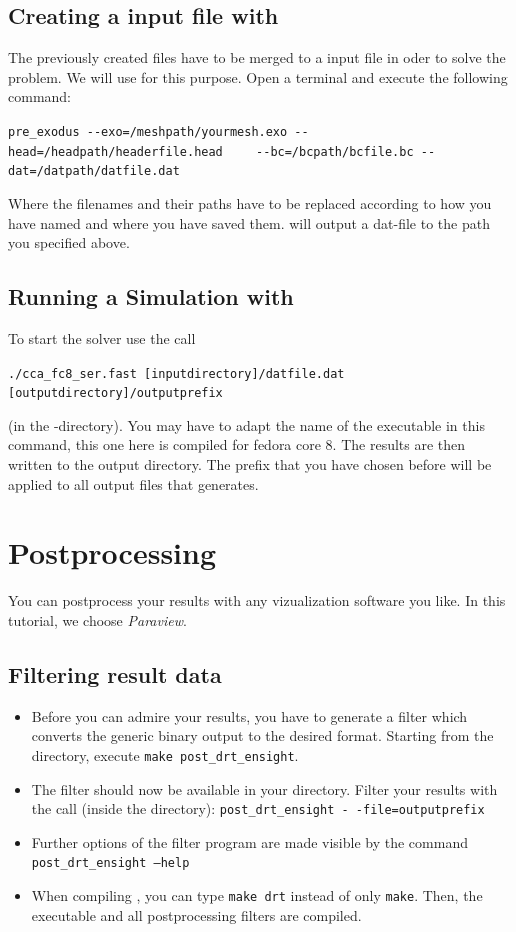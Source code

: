 \subsection{Creating a \baci{} input file with \prexo}
The previously created files have to be merged to a \baci{} input file in oder 
to solve the problem. We will use \prexo for this purpose. Open a terminal 
and execute the following command:
\begin{center}
  \verb|pre_exodus --exo=/meshpath/yourmesh.exo --head=/headpath/headerfile.head|
  \verb|	--bc=/bcpath/bcfile.bc --dat=/datpath/datfile.dat|
\end{center}
Where the filenames and their paths have to be replaced according to how you have named and where you have saved them.
\prexo will output a dat-file to the path you specified above.


\subsection{Running a Simulation with \baci{}}
\label{tut_fluid_preexo:baci}
To start the solver use the call 
\begin{center}
	\verb|./cca_fc8_ser.fast [inputdirectory]/datfile.dat [outputdirectory]/outputprefix|
\end{center}
(in the \baci{}-directory). You may have to adapt the name of the executable 
in this command, this one here is compiled for fedora core 8. The results are 
then written to the output directory. The prefix that you have chosen before will 
be applied to all output files that \baci{} generates.




\section{Postprocessing}

You can postprocess your results with any vizualization software you like. In this tutorial, we choose \emph{Paraview}. 

\subsection{Filtering result data}
\begin{itemize}
\item Before you can admire your results, you have to generate a filter 
which converts the generic binary \baci{} output to the desired format.
Starting from the \baci{} directory, execute \texttt{make post\_drt\_ensight}.
\item The filter should now be available in your \baci{} directory. Filter your results with
the call (inside the \baci{} directory): \texttt{post\_drt\_ensight -\,-file=outputprefix} 
\item Further options of the filter program are made visible by the command \texttt{post\_drt\_ensight --help}
\item When compiling \baci{}, you can type \texttt{make drt} instead of only \texttt{make}. Then, the \baci{} executable 
and all postprocessing filters are compiled.
\end{itemize}

